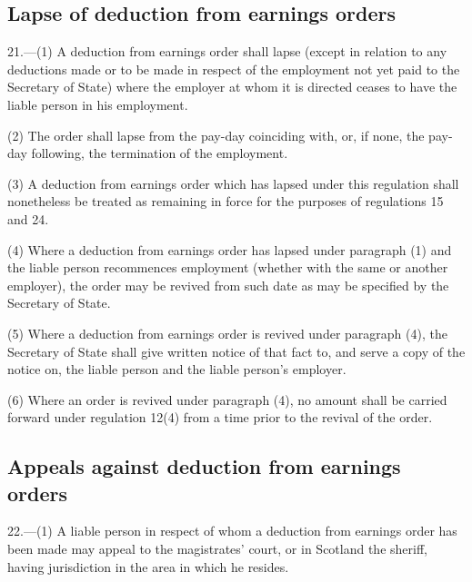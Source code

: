 \documentclass[12pt,a4paper]{article}
\begin{document}
\subsection[21. Lapse of deduction from earnings orders]{Lapse of deduction from earnings orders}

21.—(1) A deduction from earnings order shall lapse (except in relation to any deductions made or to be made in respect of the employment not yet paid to the Secretary of State) where the employer at whom it is directed ceases to have the liable person in his employment.

(2) The order shall lapse from the pay-day coinciding with, or, if none, the pay-day following, the termination of the employment.

(3) A deduction from earnings order which has lapsed under this regulation shall nonetheless be treated as remaining in force for the purposes of regulations 15 and 24.

(4) Where a deduction from earnings order has lapsed under paragraph (1) and the liable person recommences employment (whether with the same or another employer), the order may be revived from such date as may be specified by the Secretary of State.

(5) Where a deduction from earnings order is revived under paragraph (4), the Secretary of State shall give written notice of that fact to, and serve a copy of the notice on, the liable person and the liable person’s employer.

(6) Where an order is revived under paragraph (4), no amount shall be carried forward under regulation 12(4)%
from a time prior to the revival of the order.


\subsection[22. Appeals against deduction from earnings orders]{Appeals against deduction from earnings orders}

22.—(1) A liable person in respect of whom a deduction from earnings order has been made may appeal to the magistrates' court, or in Scotland the sheriff, having jurisdiction in the area in which he resides.
\end{document}
